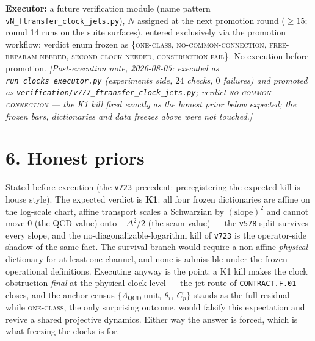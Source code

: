 \documentclass[10pt,a4paper]{article}
\begin{document}
\textbf{Executor:} a future verification module (name pattern \texttt{vN\_ftransfer\_clock\_jets.py}),
$N$ assigned at the next promotion round ($\ge 15$; round 14 runs on the suite surfaces), entered
exclusively via the promotion workflow; verdict enum frozen as
\{\textsc{one-class}, \textsc{no-common-connection}, \textsc{free-reparam-needed},
\textsc{second-clock-needed}, \textsc{construction-fail}\}. No execution before promotion.
\emph{[Post-execution note, 2026-08-05: executed as
\texttt{run\_clocks\_executor.py} (experiments side, $24$ checks, $0$ failures) and promoted as
\texttt{verification/v777\_ftransfer\_clock\_jets.py}; verdict \textsc{no-common-connection} --- the K1
kill fired exactly as the honest prior below expected; the frozen bars, dictionaries and data freezes
above were not touched.]}

\section*{6. Honest priors}

Stated before execution (the \texttt{v723} precedent: preregistering the expected kill is house style).
The expected verdict is \textbf{K1}: all four frozen dictionaries are affine on the log-scale chart,
affine transport scales a Schwarzian by $(\text{slope})^2$ and cannot move $0$ (the QCD value) onto
$-\Delta^2/2$ (the seam value) --- the \texttt{v578} split survives every slope, and the
no-diagonalizable-logarithm kill of \texttt{v723} is the operator-side shadow of the same fact. The
survival branch would require a non-affine \emph{physical} dictionary for at least one channel, and none is
admissible under the frozen operational definitions. Executing anyway is the point: a K1 kill makes the
clock obstruction \emph{final} at the physical-clock level --- the jet route of \texttt{CONTRACT.F.01}
closes, and the anchor census $\{\Lambda_{\mathrm{QCD}}\ \text{unit},\ \theta_i,\ C_p\}$ stands as the full
residual --- while \textsc{one-class}, the only surprising outcome, would falsify this expectation and
revive a shared projective dynamics. Either way the answer is forced, which is what freezing the clocks is
for.
\end{document}
